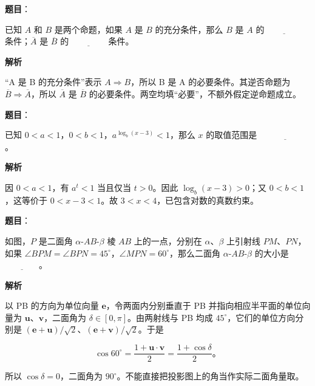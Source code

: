 \begin{answer}

\textbf{题目}：

已知 $A$ 和 $B$ 是两个命题，如果 $A$ 是 $B$ 的充分条件，那么 $B$ 是 $A$ 的 $\underline{\hspace{4em}}$ 条件；$\overline A$ 是 $\overline B$ 的 $\underline{\hspace{4em}}$ 条件。

\textbf{解析}

“A 是 B 的充分条件”表示 $A\Rightarrow B$，所以 B 是 A 的必要条件。其逆否命题为 $\overline B\Rightarrow\overline A$，所以 $\overline A$ 是 $\overline B$ 的必要条件。两空均填“必要”，不额外假定逆命题成立。


\end{answer}
\begin{answer}

\textbf{题目}：

已知 $0<a<1$，$0<b<1$，$a^{\log_b(x-3)}<1$，那么 $x$ 的取值范围是 $\underline{\hspace{6em}}$。

\textbf{解析}

因 $0<a<1$，有 $a^t<1$ 当且仅当 $t>0$。因此 $\log_b(x-3)>0$；又 $0<b<1$，这等价于 $0<x-3<1$。故 $3<x<4$，已包含对数的真数约束。


\end{answer}
\begin{answer}

\textbf{题目}：

如图，$P$ 是二面角 $\alpha$-$AB$-$\beta$ 棱 $AB$ 上的一点，分别在 $\alpha$、$\beta$ 上引射线 $PM$、$PN$，如果 $\angle BPM=\angle BPN=45^\circ$，$\angle MPN=60^\circ$，那么二面角 $\alpha$-$AB$-$\beta$ 的大小是 $\underline{\hspace{4em}}$。
\nopagebreak[4]
\begin{center}\end{center}
\nopagebreak[4]
\textbf{解析}

以 PB 的方向为单位向量 $\boldsymbol e$，令两面内分别垂直于 PB 并指向相应半平面的单位向量为 $\boldsymbol u$、$\boldsymbol v$，二面角为 $\delta\in[0,\pi]$。由两射线与 PB 均成 $45^\circ$，它们的单位方向分别是 $(\boldsymbol e+\boldsymbol u)/\sqrt2$、$(\boldsymbol e+\boldsymbol v)/\sqrt2$。于是

\nopagebreak[4]
\[
\cos60^\circ=\frac{1+\boldsymbol u\cdot\boldsymbol v}{2}
=\frac{1+\cos\delta}{2}\text{。}
\]

所以 $\cos\delta=0$，二面角为 $90^\circ$。不能直接把投影图上的角当作实际二面角量取。


\end{answer}
